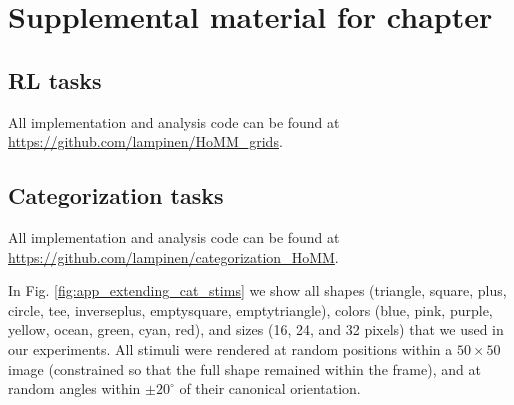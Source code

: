 \chapter{Supplemental material for chapter } \label{appendix:extending}

\section{RL tasks} \label{app_extending_rl_tasks}

All implementation and analysis code can be found at \url{https://github.com/lampinen/HoMM_grids}.\par

\section{Categorization tasks} \label{app_extending_categorization_tasks}
All implementation and analysis code can be found at \url{https://github.com/lampinen/categorization_HoMM}.\par
In Fig. \ref{fig:app_extending_cat_stims} we show all shapes (triangle, square, plus, circle, tee, inverseplus, emptysquare, emptytriangle), colors (blue, pink, purple, yellow, ocean, green, cyan, red), and sizes (16, 24, and 32 pixels) that we used in our experiments. All stimuli were rendered at random positions within a \(50 \times 50\) image (constrained so that the full shape remained within the frame), and at random angles within \(\pm20^{\circ}\) of their canonical orientation.\par

